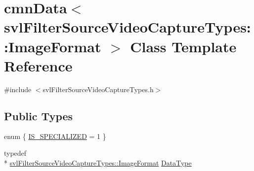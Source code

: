 \hypertarget{classcmn_data_3_01svl_filter_source_video_capture_types_1_1_image_format_01_4}{\section{cmn\-Data$<$ svl\-Filter\-Source\-Video\-Capture\-Types\-:\-:Image\-Format $>$ Class Template Reference}
\label{classcmn_data_3_01svl_filter_source_video_capture_types_1_1_image_format_01_4}
}


{\ttfamily \#include $<$svl\-Filter\-Source\-Video\-Capture\-Types.\-h$>$}

\subsection*{Public Types}
\begin{DoxyCompactItemize}
\item 
enum \{ \hyperlink{classcmn_data_3_01svl_filter_source_video_capture_types_1_1_image_format_01_4_aa7ad497c4ee45ff0b87968cf884db467abf991dde75ea0e092b74b6405ec0e683}{I\-S\-\_\-\-S\-P\-E\-C\-I\-A\-L\-I\-Z\-E\-D} = 1
 \}
\item 
typedef \\*
\hyperlink{classsvl_filter_source_video_capture_types_1_1_image_format}{svl\-Filter\-Source\-Video\-Capture\-Types\-::\-Image\-Format} \hyperlink{classcmn_data_3_01svl_filter_source_video_capture_types_1_1_image_format_01_4_addfc3b80307fd56e73fbbf1f6eb63edb}{Data\-Type}
\end{DoxyCompactItemize}
